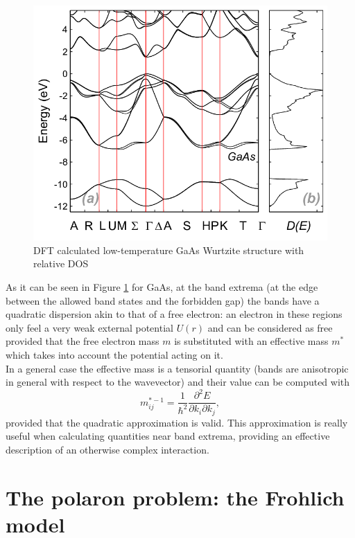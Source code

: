 \documentclass[12pt, a4paper]{report}
\numberwithin{equation}{section}
\begin{document}
\begin{figure}[H]
    \centering
    \includegraphics[scale=0.4]{a-Calculated-low-temperature-band-structure-for-GaAs-in-WZ-phase-b-Calculated-DOS.png}
    \caption{DFT calculated low-temperature GaAs Wurtzite structure with relative DOS \cite{GaAs_wurtzite_structure}}
    \label{fig:GaAs_Wurtzite_structure}
\end{figure}
As it can be seen in Figure \ref{fig:GaAs_Wurtzite_structure} for GaAs, at the band extrema (at the edge between the allowed band states 
and the forbidden gap) the bands have a quadratic dispersion akin to that of a free electron: an electron in these regions only feel a 
very weak external potential $U(r)$ and can be considered as free provided that the free electron mass $m$ is substituted with an effective mass 
$m^*$ which takes into account the potential acting on it.\\
In a general case the effective mass is a tensorial quantity (bands are anisotropic in general with respect to the wavevector) and 
their value can be computed with
\begin{equation}
    m^{*-1}_{ij}=\frac{1}{\hbar^2}\frac{\partial^2 E}{\partial k_i \partial k_j},
\end{equation}
provided that the quadratic approximation is valid. This approximation is really useful when calculating quantities near band extrema, 
providing an effective description of an otherwise complex interaction.
\section{The polaron problem: the Frohlich model}
\printbibliography
\end{document}
